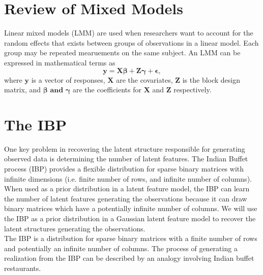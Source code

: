 \documentclass[mathserif]{article}
\newcommand{\m}[1]{\mathbf{\bm{#1}}} %
\begin{document}
\section*{Review of Mixed Models}
Linear mixed models (LMM) are used when researchers want to account for the
random effects that exists between groups of observations in a linear model.
Each group may be repeated mearuements on the same subject. An LMM can be
expressed in mathematical terms as
\[
  \m{y = X\beta + Z\gamma + \epsilon},
\]
where $\m{y}$ is a vector of responses, $\m{X}$ are the covariates, $\m{Z}$ is
the block design matrix, and $\m{\beta \text{ and } \gamma}$ are the coefficients for $\m{X}$ and $\m{Z}$ respectively.


\section*{The IBP}
One key problem in recovering the latent structure responsible for generating
observed data is determining the number of latent features. The Indian Buffet
process (IBP) provides a flexible distribution for sparse binary matrices with
infinite dimensions (i.e. finite number of rows, and infinite number of
columns).  When used as a prior distribution in a latent feature model, the IBP
can learn the number of latent features generating the observations because it
can draw binary matrices which have a potentially infinite number of columns.
We will use the IBP as a prior distribution in a Gaussian latent feature model
to recover the latent structures generating the observations.\\

\noindent
The IBP is a distribution for sparse binary matrices with a finite number of
rows and potentially an infinite number of columns. The process of generating a
realization from the IBP can be described by an analogy involving Indian buffet
restaurants.\\
\end{document}
